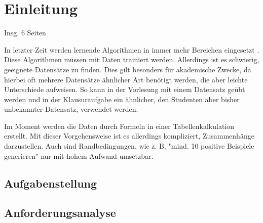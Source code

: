
\chapter{Einleitung}

Insg. 6 Seiten

In letzter Zeit werden lernende Algorithmen in immer mehr Bereichen eingesetzt \cite{mengesonnentag:2018}. Diese Algorithmen müssen mit Daten trainiert werden. Allerdings ist es schwierig, geeignete Datensätze zu finden. Dies gilt besonders für akademische Zwecke, da hierbei oft mehrere Datensätze ähnlicher Art benötigt werden, die aber leichte Unterschiede aufweisen. So kann in der Vorlesung mit einem Datensatz geübt werden und in der Klausuraufgabe ein ähnlicher, den Studenten aber bisher unbekannter Datensatz, verwendet werden.

Im Moment werden die Daten durch Formeln in einer Tabellenkalkulation erstellt. Mit dieser Vorgehensweise ist es allerdings kompliziert, Zusammenhänge darzustellen. Auch sind Randbedingungen, wie z. B. "mind. 10 positive Beispiele generieren" nur mit hohem Aufwand umsetzbar.

\section{Aufgabenstellung}

\section{Anforderungsanalyse}
